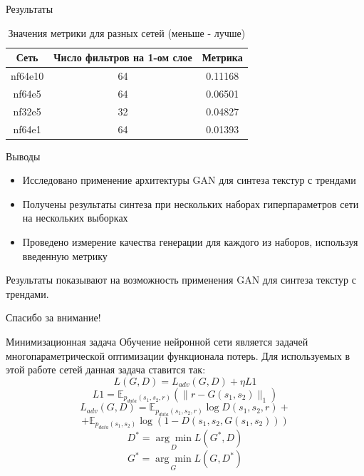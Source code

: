 \documentclass[12pt]{beamer}
\begin{document}
	\begin{frame}{Результаты}
		\begin{table}
			\begin{center}
				\begin{tabular}{|c|c|c|}
					\hline
					Сеть & Число фильтров на 1-ом слое & Метрика \\
					\hline
					nf64e10 & 64& 0.11168\\
					\hline
					nf64e5 & 64 & 0.06501\\
					\hline
					nf32e5 & 32 & 0.04827\\
					\hline
					nf64e1 & 64 & 0.01393\\
					\hline
				\end{tabular}
				\caption{Значения метрики для разных сетей (меньше - лучше)}
			\end{center}
		\end{table}
	\end{frame}
	
	\begin{frame}{Выводы}
		\begin{itemize}
			\item Исследовано применение архитектуры GAN для синтеза текстур с трендами
			\item Получены результаты синтеза при нескольких наборах гиперпараметров сети на нескольких выборках
			\item Проведено измерение качества генерации для каждого из наборов, используя введенную метрику
		\end{itemize}
		Результаты показывают на возможность применения GAN для синтеза текстур с трендами.
	\end{frame}
	
	\begin{frame}
		\centering\huge{Спасибо за внимание!}
	\end{frame}
	
	\begin{frame}{Минимизационная задача}
		Обучение нейронной сети является задачей многопараметрической оптимизации функционала потерь. Для используемых в этой работе сетей данная задача ставится так:
		 $$ L(G, D) = L_{adv}(G, D) + \eta L1$$
		 $$L1 = \mathbb{E}_{p_{data}(s_1, s_2, r)} (\parallel r - G(s_1, s_2) \parallel_1)$$
		 $$ L_{adv}(G, D) = \mathbb{E}_{p_{data}(s_1, s_2, r)}\log D(s_1, s_2, r)+ $$
		 $$ +  \mathbb{E}_{p_{data}(s_1, s_2)} \log (1 - D(s_1, s_2, G(s_1, s_2))) $$
		 $$ D^* = \underset{D}{\arg\min} L(G^*, D)  $$
		 $$ G^* = \underset{G}{\arg\min} L(G, D^*)  $$
	\end{frame}
\end{document}
